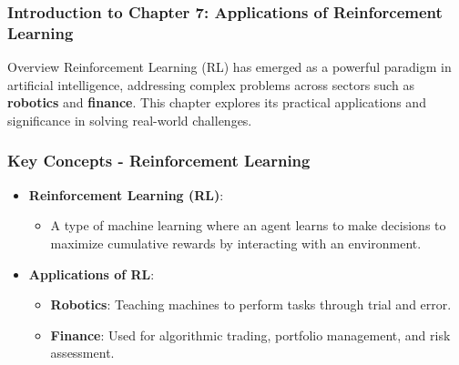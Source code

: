 \documentclass[aspectratio=169]{beamer}
\begin{document}
\frame{\titlepage}

\begin{frame}[fragile]
    \titlepage
\end{frame}

\begin{frame}[fragile]
    \frametitle{Introduction to Chapter 7: Applications of Reinforcement Learning}
    
    \begin{block}{Overview}
        Reinforcement Learning (RL) has emerged as a powerful paradigm in artificial intelligence, addressing complex problems across sectors such as \textbf{robotics} and \textbf{finance}. This chapter explores its practical applications and significance in solving real-world challenges.
    \end{block}
\end{frame}

\begin{frame}[fragile]
    \frametitle{Key Concepts - Reinforcement Learning}
    
    \begin{itemize}
        \item \textbf{Reinforcement Learning (RL)}:
            \begin{itemize}
                \item A type of machine learning where an agent learns to make decisions to maximize cumulative rewards by interacting with an environment.
            \end{itemize}
        \item \textbf{Applications of RL}:
            \begin{itemize}
                \item \textbf{Robotics}: Teaching machines to perform tasks through trial and error.
                \item \textbf{Finance}: Used for algorithmic trading, portfolio management, and risk assessment.
            \end{itemize}
    \end{itemize}
\end{frame}
\end{document}
